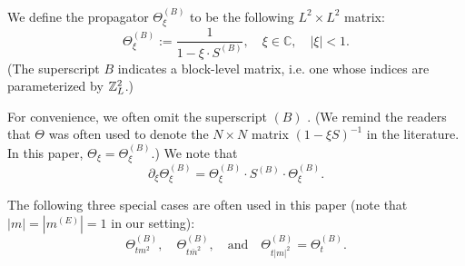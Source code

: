  \begin{definition}\label{def_Theta}
We define the propagator $\Theta^{(B)}_{\xi}$ to be the following $L^{2}\times L^{2}$ matrix:
\begin{equation}\label{def_Thxi}
    \Theta^{(B)}_\xi := \frac{1}{1 - \xi \cdot S^{(B)}}, \quad \xi \in \mathbb{C}, \quad |\xi| < 1.
\end{equation}
(The superscript $B$ indicates a block-level matrix, i.e. one whose indices are parameterized by $\mathbb{Z}_{L}^{2}$.)
\end{definition}

For convenience, we often omit the superscript $(B)$ . (We remind the readers that $\Theta$  was often  used to denote the \(N \times N\) matrix  \((1 - \xi S)^{-1}\) in the literature.   In this paper,  $\Theta_\xi= \Theta_\xi^{(B)}$.) We note that
\begin{equation}\label{deri_Thxi}
    \partial_\xi \Theta^{(B)}_\xi = \Theta^{(B)}_\xi \cdot S^{(B)} \cdot \Theta^{(B)}_\xi.
\end{equation}

The following  three special  cases are often used in this paper (note that $|m|=|m^{(E)}|=1$ in our setting):
\[
\Theta^{(B)}_{t m^2}, \quad \Theta^{(B)}_{t \bar{m}^2}, \quad \text{and} \quad \Theta^{(B)}_{t |m|^2} = \Theta^{(B)}_{t}.
\]



